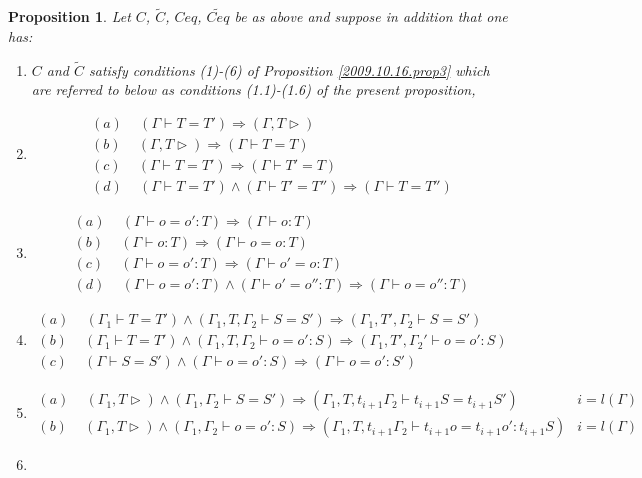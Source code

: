 \documentclass[11pt]{article}
\newtheorem{proposition}{Proposition}[subsection]
\newcommand{\llabel}[1]{\label{#1}}
\newcommand{\wt}{\widetilde}
\newcommand{\spc}{{\,\,\,\,\,\,\,}}
\newcommand{\impl}{{\Rightarrow}}
\begin{document}
\begin{proposition}
\llabel{2014.07.10.prop1}
%
Let $C$, $\wt{C}$, $Ceq$, $\wt{Ceq}$ be as above and suppose in addition that one has:
%
\begin{enumerate}
\item $C$ and $\wt{C}$ satisfy conditions (1)-(6) of Proposition \ref{2009.10.16.prop3} which are referred to below as conditions (1.1)-(1.6) of the present proposition,
%
\item 
%
$$
\begin{array}{l}
(a)\spc(\Gamma\vdash T=T')\impl (\Gamma,T\rhd)\\
(b)\spc(\Gamma,T\rhd)\impl (\Gamma\vdash T=T)\\
(c )\spc(\Gamma\vdash T=T')\impl(\Gamma\vdash T'=T)\\
(d)\spc(\Gamma\vdash T=T')\wedge(\Gamma\vdash T'=T'')\impl(\Gamma\vdash T=T'')
\end{array}
$$
%
\item 
%
$$
\begin{array}{l}
(a)\spc(\Gamma\vdash o=o':T)\impl (\Gamma\vdash o:T)\\
(b)\spc(\Gamma\vdash o:T)\impl (\Gamma\vdash o=o:T)\\
(c )\spc(\Gamma\vdash o=o':T)\impl(\Gamma\vdash o'=o:T)\\
(d)\spc (\Gamma\vdash o=o':T)\wedge(\Gamma\vdash o'=o'':T)\impl(\Gamma\vdash o=o'':T)
\end{array}
$$
%
\item 
%
$$
\begin{array}{l}
(a)\spc (\Gamma_1\vdash T=T')\wedge(\Gamma_1,T,\Gamma_2\vdash S=S')\impl(\Gamma_1,T',\Gamma_2\vdash S=S')\\
(b)\spc (\Gamma_1\vdash T=T')\wedge(\Gamma_1,T,\Gamma_2\vdash o=o':S)\impl(\Gamma_1,T',\Gamma_2'\vdash o=o':S)\\
(c )\spc (\Gamma\vdash S=S')\wedge(\Gamma\vdash o=o':S)\impl(\Gamma\vdash o=o':S')
\end{array}
$$
%
\item 
%
$$
\begin{array}{ll}
(a)\spc (\Gamma_1,T\rhd)\wedge(\Gamma_1,\Gamma_2\vdash S=S')\impl(\Gamma_1,T,t_{i+1}\Gamma_2\vdash t_{i+1}S=t_{i+1}S')& i=l(\Gamma)\\
(b)\spc (\Gamma_1,T\rhd)\wedge(\Gamma_1,\Gamma_2\vdash o=o':S)\impl(\Gamma_1,T,t_{i+1}\Gamma_2\vdash t_{i+1}o=t_{i+1}o':t_{i+1}S)& i=l(\Gamma)
\end{array}
$$
%
\item
%
$$
\begin{array}{ll}

\end{array}$$
\end{enumerate}
\end{proposition}
\end{document}
